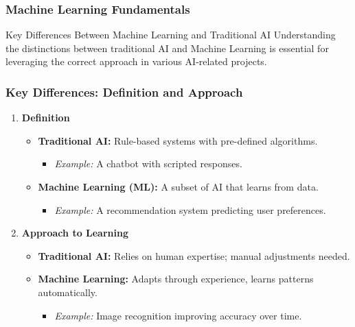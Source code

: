 \documentclass[aspectratio=169]{beamer}
\begin{document}
\begin{frame}[fragile]
    \frametitle{Machine Learning Fundamentals}
    \begin{block}{Key Differences Between Machine Learning and Traditional AI}
        Understanding the distinctions between traditional AI and Machine Learning is essential for leveraging the correct approach in various AI-related projects.
    \end{block}
\end{frame}

\begin{frame}[fragile]
    \frametitle{Key Differences: Definition and Approach}
    \begin{enumerate}
        \item \textbf{Definition}
            \begin{itemize}
                \item \textbf{Traditional AI:} Rule-based systems with pre-defined algorithms.
                    \begin{itemize}
                        \item \textit{Example:} A chatbot with scripted responses.
                    \end{itemize}
                \item \textbf{Machine Learning (ML):} A subset of AI that learns from data.
                    \begin{itemize}
                        \item \textit{Example:} A recommendation system predicting user preferences.
                    \end{itemize}
            \end{itemize}

        \item \textbf{Approach to Learning}
            \begin{itemize}
                \item \textbf{Traditional AI:} Relies on human expertise; manual adjustments needed.
                \item \textbf{Machine Learning:} Adapts through experience, learns patterns automatically.
                    \begin{itemize}
                        \item \textit{Example:} Image recognition improving accuracy over time.
                    \end{itemize}
            \end{itemize}
    \end{enumerate}
\end{frame}
\end{document}
